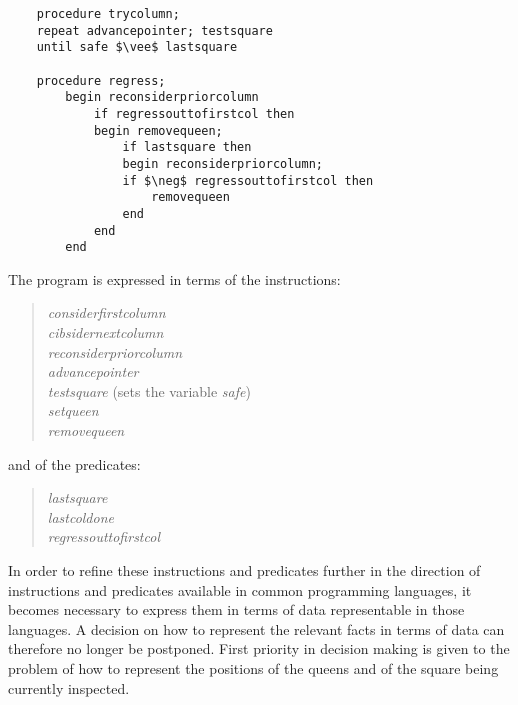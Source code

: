 \begin{lstlisting}
    procedure trycolumn;
    repeat advancepointer; testsquare
    until safe $\vee$ lastsquare

    procedure regress;
        begin reconsiderpriorcolumn
            if regressouttofirstcol then
            begin removequeen;
                if lastsquare then
                begin reconsiderpriorcolumn;
                if $\neg$ regressouttofirstcol then
                    removequeen
                end
            end
        end
\end{lstlisting}

The program is expressed in terms of the instructions:

\begin{quote}
\emph{considerfirstcolumn}\\
\emph{cibsidernextcolumn}\\
\emph{reconsiderpriorcolumn}\\
\emph{advancepointer}\\
\emph{testsquare} (sets the variable \emph{safe})\\
\emph{setqueen}\\
\emph{removequeen}\\
\end{quote}

and of the predicates:

\begin{quote}
\emph{lastsquare}\\
\emph{lastcoldone}\\
\emph{regressouttofirstcol}\\
\end{quote}

In order to refine these instructions and predicates further in the direction
of instructions and predicates available in common programming languages, it
becomes necessary to express them in terms of data representable in those
languages.  A decision on how to represent the relevant facts in terms of data
can therefore no longer be postponed.  First priority in decision making is
given to the problem of how to represent the positions of the queens and of the
square being currently inspected.

